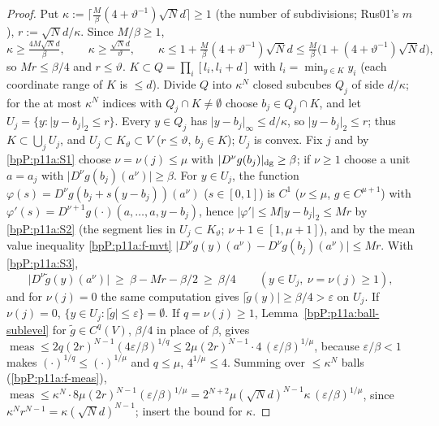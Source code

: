 \begin{proof}
Put $\kappa:=\lceil\tfrac M\beta(4+\vartheta^{-1})\sqrt Nd\rceil\ge1$ (the number of subdivisions; Rus01's $m$), $r:=\sqrt Nd/\kappa$. Since $M/\beta\ge1$,
\[\kappa\ge\tfrac{4M\sqrt Nd}\beta,\qquad\kappa\ge\tfrac{\sqrt Nd}\vartheta,\qquad\kappa\le1+\tfrac M\beta(4+\vartheta^{-1})\sqrt Nd\le\tfrac M\beta\big(1+(4+\vartheta^{-1})\sqrt Nd\big),\]
so $Mr\le\beta/4$ and $r\le\vartheta$.
\label{stepP:p11a:sl-cover} $K\subset Q=\prod_i[l_i,l_i+d]$ with $l_i=\min_{y\in K}y_i$ (each coordinate range of $K$ is $\le d$). Divide $Q$ into $\kappa^N$ closed subcubes $Q_j$ of side $d/\kappa$; for the at most $\kappa^N$ indices with $Q_j\cap K\ne\emptyset$ choose $b_j\in Q_j\cap K$, and let $U_j=\{y:\lvert y-b_j\rvert_2\le r\}$. Every $y\in Q_j$ has $\lvert y-b_j\rvert_\infty\le d/\kappa$, so $\lvert y-b_j\rvert_2\le r$; thus $K\subset\bigcup_jU_j$, and $U_j\subset K_\vartheta\subset V$ ($r\le\vartheta$, $b_j\in K$); $U_j$ is convex.
\label{stepP:p11a:sl-lower} Fix $j$ and by \ref{bpP:p11a:S1} choose $\nu=\nu(j)\le\mu$ with $\lvert D^\nu g(b_j)\rvert_{\mathrm{dg}}\ge\beta$; if $\nu\ge1$ choose a unit $a=a_j$ with $\lvert D^\nu g(b_j)(a^\nu)\rvert\ge\beta$. For $y\in U_j$, the function $\varphi(s)=D^\nu g(b_j+s(y-b_j))(a^\nu)$ ($s\in[0,1]$) is $C^1$ ($\nu\le\mu$, $g\in C^{\mu+1}$) with $\varphi'(s)=D^{\nu+1}g(\cdot)(a,\dots,a,y-b_j)$, hence $\lvert\varphi'\rvert\le M\lvert y-b_j\rvert_2\le Mr$ by \ref{bpP:p11a:S2} (the segment lies in $U_j\subset K_\vartheta$; $\nu+1\in[1,\mu+1]$), and by the mean value inequality \ref{bpP:p11a:f-mvt} $\lvert D^\nu g(y)(a^\nu)-D^\nu g(b_j)(a^\nu)\rvert\le Mr$. With \ref{bpP:p11a:S3},
\[\lvert D^\nu\tilde g(y)(a^\nu)\rvert\ \ge\ \beta-Mr-\beta/2\ \ge\ \beta/4\qquad(y\in U_j,\ \nu=\nu(j)\ge1),\]
and for $\nu(j)=0$ the same computation gives $\lvert\tilde g(y)\rvert\ge\beta/4>\varepsilon$ on $U_j$.
\label{stepP:p11a:sl-ball} If $\nu(j)=0$, $\{y\in U_j:\lvert\tilde g\rvert\le\varepsilon\}=\emptyset$. If $q=\nu(j)\ge1$, Lemma~\ref{bpP:p11a:ball-sublevel} for $\tilde g\in C^q(V)$, $\beta/4$ in place of $\beta$, gives $\operatorname{meas}\le2q(2r)^{N-1}(4\varepsilon/\beta)^{1/q}\le2\mu(2r)^{N-1}\cdot4\,(\varepsilon/\beta)^{1/\mu}$, because $\varepsilon/\beta<1$ makes $(\cdot)^{1/q}\le(\cdot)^{1/\mu}$ and $q\le\mu$, $4^{1/\mu}\le4$.
\label{stepP:p11a:sl-sum} Summing over $\le\kappa^N$ balls (\ref{bpP:p11a:f-meas}), $\operatorname{meas}\le\kappa^N\cdot8\mu(2r)^{N-1}(\varepsilon/\beta)^{1/\mu}=2^{N+2}\mu(\sqrt Nd)^{N-1}\kappa\,(\varepsilon/\beta)^{1/\mu}$, since $\kappa^Nr^{N-1}=\kappa(\sqrt Nd)^{N-1}$; insert the bound for $\kappa$.
\end{proof}

